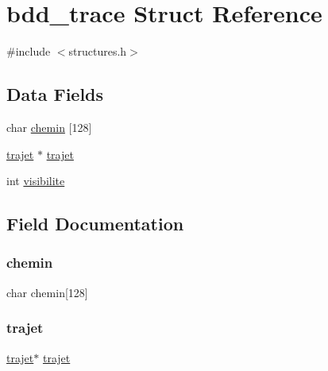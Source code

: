 \hypertarget{structbdd__trace}{}\section{bdd\+\_\+trace Struct Reference}
\label{structbdd__trace}


{\ttfamily \#include $<$structures.\+h$>$}

\subsection*{Data Fields}
\begin{DoxyCompactItemize}
\item 
char \hyperlink{structbdd__trace_afea51aac2a88c01d5ad5f97fc91ec472}{chemin} \mbox{[}128\mbox{]}
\item 
\hyperlink{structtrajet}{trajet} $\ast$ \hyperlink{structbdd__trace_ad417eb03de659793c712421b340fbec4}{trajet}
\item 
int \hyperlink{structbdd__trace_aa34b47a3ed3a7dfed8a672132bcc3f2a}{visibilite}
\end{DoxyCompactItemize}


\subsection{Field Documentation}
\hypertarget{structbdd__trace_afea51aac2a88c01d5ad5f97fc91ec472}{}\label{structbdd__trace_afea51aac2a88c01d5ad5f97fc91ec472} 
\subsubsection{\texorpdfstring{chemin}{chemin}}
{\footnotesize\ttfamily char chemin\mbox{[}128\mbox{]}}

\hypertarget{structbdd__trace_ad417eb03de659793c712421b340fbec4}{}\label{structbdd__trace_ad417eb03de659793c712421b340fbec4} 
\subsubsection{\texorpdfstring{trajet}{trajet}}
{\footnotesize\ttfamily \hyperlink{structtrajet}{trajet}$\ast$ \hyperlink{structtrajet}{trajet}}

\hypertarget{structbdd__trace_aa34b47a3ed3a7dfed8a672132bcc3f2a}{}\label{structbdd__trace_aa34b47a3ed3a7dfed8a672132bcc3f2a} 
